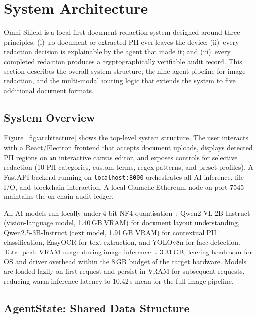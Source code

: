 \section{System Architecture}
\label{sec:architecture}

Omni-Shield is a local-first document redaction system
designed around three principles:
(i)~no document or extracted PII ever leaves the
device;
(ii)~every redaction decision is explainable by the
agent that made it;
and (iii)~every completed redaction produces a
cryptographically verifiable audit record.
This section describes the overall system structure,
the nine-agent pipeline for image redaction, and the
multi-modal routing logic that extends the system to
five additional document formats.

\subsection{System Overview}

Figure~\ref{fig:architecture} shows the top-level
system structure.
The user interacts with a React/Electron frontend that
accepts document uploads, displays detected PII regions
on an interactive canvas editor, and exposes controls
for selective redaction (10 PII categories, custom
terms, regex patterns, and preset profiles).
A FastAPI backend running on \texttt{localhost:8000}
orchestrates all AI inference, file I/O, and blockchain
interaction.
A local Ganache Ethereum node on port 7545 maintains
the on-chain audit ledger.

All AI models run locally under 4-bit NF4
quantisation~\cite{dettmers2023qlora}:
Qwen2-VL-2B-Instruct (vision-language model, 1.40\,GB
VRAM) for document layout understanding,
Qwen2.5-3B-Instruct (text model, 1.91\,GB VRAM) for
contextual PII classification, EasyOCR for text
extraction, and YOLOv8n for face detection.
Total peak VRAM usage during image inference is
3.31\,GB, leaving headroom for OS and driver overhead
within the 8\,GB budget of the target hardware.
Models are loaded lazily on first request and persist
in VRAM for subsequent requests, reducing warm
inference latency to 10.42\,s mean for the full
image pipeline.

\subsection{AgentState: Shared Data Structure}

